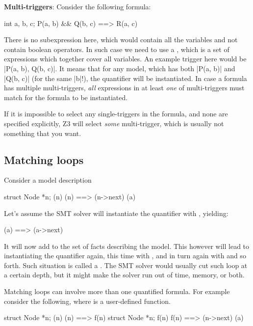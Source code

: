 \begin{note}
\textbf{Multi-triggers}:
Consider the following formula:
\begin{VCC}
\forall int a, b, c; P(a, b) && Q(b, c) ==> R(a, c)
\end{VCC}
There is no subexpression here, which would contain all the variables
and not contain boolean operators.
In such case we need to use a , which
is a set of expressions which together cover all variables.
An example trigger here would be \vcc|{P(a, b), Q(b, c)}|.
It means that for any model, which has both \vcc|P(a, b)|
and \vcc|Q(b, c)| (for the same \vcc|b|!), the quantifier
will be instantiated.
In case a formula has multiple multi-triggers, \emph{all}
expressions in at least \emph{one} of multi-triggers
must match for the formula to be instantiated.

If it is impossible to select any single-triggers in the formula,
and none are specified explicitly, Z3 will select \emph{some}
multi-trigger, which is usually not something that you want.
\end{note}

\subsection{Matching loops}

Consider a model description
\begin{VCC}
\forall struct Node *n; {\mine(n)} \mine(n) ==> \mine(n->next)
\mine(a)
\end{VCC}
Let's assume the SMT solver will instantiate the quantifier with , yielding:
\begin{VCC}
\mine(a) ==> \mine(a->next)
\end{VCC}
It will now add  to the set of facts
describing the model.
This however will lead to instantiating the quantifier again,
this time with , and in turn again with
 and so forth.
Such situation is called a .
The SMT solver would usually cut such loop at a certain depth,
but it might make the solver run out of time, memory, or both.

Matching loops can involve more than one quantified formula. 
For example consider the following, where  is a user-defined function.
\begin{VCC}
\forall struct Node *n; {\mine(n)} \mine(n) ==> f(n)
\forall struct Node *n; {f(n)} f(n) ==> \mine(n->next)
\mine(a)
\end{VCC}


